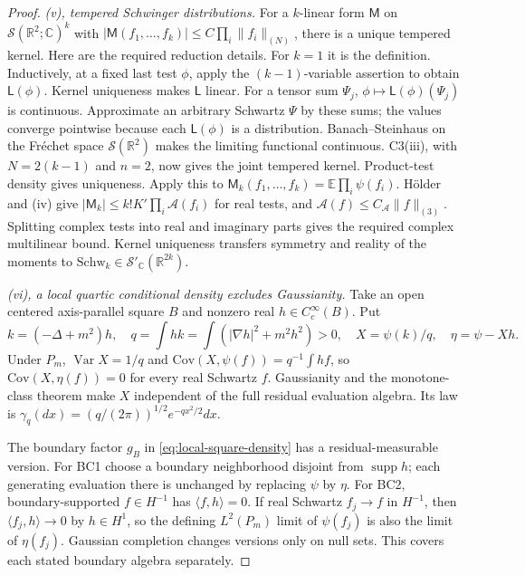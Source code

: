 \documentclass[11pt]{article}
\theoremstyle{plain}
\theoremstyle{definition}
\theoremstyle{remark}
\newcommand{\R}{\mathbb{R}}
\newcommand{\C}{\mathbb{C}}
\newcommand{\E}{\mathbb{E}}
\newcommand{\cS}{\mathcal{S}}
\newcommand{\cA}{\mathcal{A}}
\newcommand{\Schw}{\mathrm{Schw}}
\DeclareMathOperator{\supp}{supp}
\DeclareMathOperator{\Var}{Var}
\begin{document}
\begin{proof}
\label{proof:CT-v}
\emph{(v), tempered Schwinger distributions.}
For a $k$-linear form $\mathsf M$ on $\cS(\R^2;\C)^k$ with
$|\mathsf M(f_1,\ldots,f_k)|\le C\prod_i\|f_i\|_{(N)}$, there is a
unique tempered kernel. Here are the required reduction details. For
$k=1$ it is the definition. Inductively, at a fixed last test $\phi$,
apply the $(k-1)$-variable assertion to obtain $\mathsf L(\phi)$.
Kernel uniqueness makes $\mathsf L$ linear. For a tensor sum $\Psi_j$,
$\phi\mapsto\mathsf L(\phi)(\Psi_j)$ is continuous. Approximate an
arbitrary Schwartz $\Psi$ by these sums; the values converge pointwise
because each $\mathsf L(\phi)$ is a distribution. Banach--Steinhaus on
the Fr\'echet space $\cS(\R^2)$ makes the limiting functional continuous.
C3(iii), with $N=2(k-1)$ and $n=2$, now gives the joint tempered kernel.
Product-test density gives uniqueness.
Apply this to $\mathsf M_k(f_1,\ldots,f_k)=\E\prod_i\psi(f_i)$.
H\"older and (iv) give $|\mathsf M_k|\le k!K'\prod_i\cA(f_i)$ for real
tests, and $\cA(f)\le C_\cA\|f\|_{(3)}$. Splitting complex tests into
real and imaginary parts gives the required complex multilinear bound.
Kernel uniqueness transfers symmetry and reality of the moments to
$\Schw_k\in\cS'_\C(\R^{2k})$.

\label{proof:CT-vi-coordinate}
\emph{(vi), a local quartic conditional density excludes Gaussianity.}
Take an open centered axis-parallel square $B$ and nonzero real
$h\in C_c^\infty(B)$. Put
\[
 k=(-\Delta+m^2)h,\quad q=\int hk=\int(|\nabla h|^2+m^2h^2)>0,
 \quad X=\psi(k)/q,\quad \eta=\psi-Xh.
\]
Under $P_m$, $\Var X=1/q$ and
$\mathrm{Cov}(X,\psi(f))=q^{-1}\int hf$, so
$\mathrm{Cov}(X,\eta(f))=0$ for every real Schwartz $f$.
Gaussianity and the monotone-class theorem make $X$ independent of
the full residual evaluation algebra. Its law is
$\gamma_q(dx)=(q/(2\pi))^{1/2}e^{-qx^2/2}dx$.

The boundary factor $g_B$ in \eqref{eq:local-square-density} has a
residual-measurable version. For BC1 choose a boundary neighborhood
disjoint from $\supp h$; each generating evaluation there is unchanged
by replacing $\psi$ by $\eta$. For BC2, boundary-supported
$f\in H^{-1}$ has $\langle f,h\rangle=0$. If real Schwartz
$f_j\to f$ in $H^{-1}$, then $\langle f_j,h\rangle\to0$ by
$h\in H^1$, so the defining $L^2(P_m)$ limit of $\psi(f_j)$ is also
the limit of $\eta(f_j)$. Gaussian completion changes versions only
on null sets. This covers each stated boundary algebra separately.


\end{proof}
\end{document}
